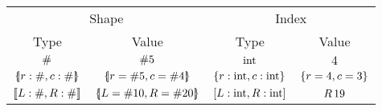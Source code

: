 \begin{tabular}{@{}cc|cc@{}}
\multicolumn{2}{c|}{Shape} & \multicolumn{2}{c}{Index} \\
Type & Value & Type & Value \\ \hline
$\#$ & $\#{5}$ & $\mathrm{int}$ & $4$ \\
$\sproducttype{ r : \ssized, c : \ssized }$ & $\sproductval{r = \ssize{5}, c = \ssize{4} }$ & $\srecordtype{ r : \sint, c : \sint }$ & $\srecordval{ r = 4, c = 3 }$ \\ 
$\sconcattype{L : \ssized, R : \ssized}$ & $\sproductval{ L = \ssize{10}, R = \ssize{20} }$ & $\svarianttype {L: \sint, R: \sint}$ & ${R}\,{19}$ \\ 
\end{tabular}